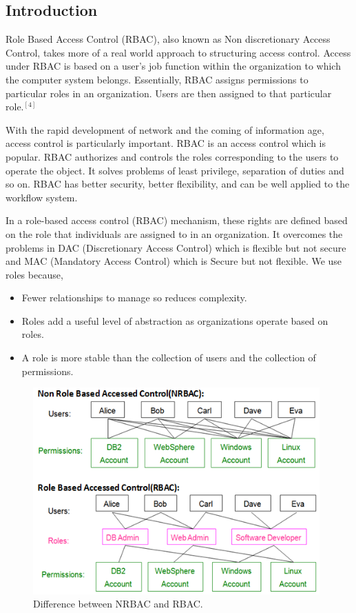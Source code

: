 \documentclass[12pt]{report}
\begin{document}
\subsection{Introduction}
	\hspace{6mm}Role Based Access Control (RBAC), also known as Non discretionary Access Control, takes more of a real world approach to structuring access control. Access under RBAC is based on a user's job function within the organization to which the computer system belongs. Essentially, RBAC assigns permissions to particular roles in an organization. Users are then assigned to that particular role.$ ^{[4]}$\newline
		
With the rapid development of network and the coming of information age, access control is particularly important. RBAC is an access control which is popular. RBAC authorizes and controls the roles corresponding to the users to operate the object. It solves problems of least privilege, separation of duties and so on. RBAC has better security, better flexibility, and can be well applied to the workflow system.\newline

In a role-based access control (RBAC) mechanism, these rights are defined based on the role that individuals are assigned to in an organization. It overcomes the problems in DAC (Discretionary Access Control) which is flexible but not secure and MAC (Mandatory Access Control) which is Secure but not flexible. We use roles because,\\

	\begin{itemize}
		\item Fewer relationships to manage so reduces complexity.
		\item Roles add a useful level of abstraction as organizations operate based on roles.
		\item A role is more stable than the collection of users and the collection of permissions.
	\end{itemize}

	\begin{figure}[H]
	\begin{center}
	\includegraphics[width=11cm]{./4-1.png}
	\caption{ Difference between NRBAC and RBAC. \label{fig:Difference between NRBAC and RBAC. }}
	\end{center}
	\end{figure}
\newpage
\end{document}
